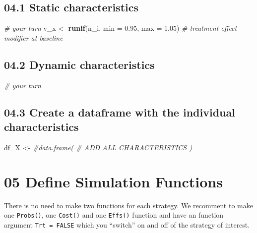 \documentclass[
]{article}
\newenvironment{Shaded}{\begin{snugshade}}{\end{snugshade}}
\newcommand{\CommentTok}[1]{\textcolor[rgb]{0.56,0.35,0.01}{\textit{#1}}}
\newcommand{\DataTypeTok}[1]{\textcolor[rgb]{0.13,0.29,0.53}{#1}}
\newcommand{\FloatTok}[1]{\textcolor[rgb]{0.00,0.00,0.81}{#1}}
\newcommand{\KeywordTok}[1]{\textcolor[rgb]{0.13,0.29,0.53}{\textbf{#1}}}
\newcommand{\NormalTok}[1]{#1}
\newcommand{\StringTok}[1]{\textcolor[rgb]{0.31,0.60,0.02}{#1}}
\begin{document}
\hypertarget{static-characteristics}{%
\subsection{04.1 Static characteristics}\label{static-characteristics}}

\begin{Shaded}
\begin{Highlighting}[]
\CommentTok{# your turn}
\NormalTok{v_x     <-}\StringTok{ }\KeywordTok{runif}\NormalTok{(n_i, }\DataTypeTok{min =} \FloatTok{0.95}\NormalTok{, }\DataTypeTok{max =} \FloatTok{1.05}\NormalTok{) }\CommentTok{# treatment effect modifier at baseline }
\end{Highlighting}
\end{Shaded}

\hypertarget{dynamic-characteristics}{%
\subsection{04.2 Dynamic
characteristics}\label{dynamic-characteristics}}

\begin{Shaded}
\begin{Highlighting}[]
\CommentTok{# your turn}
\end{Highlighting}
\end{Shaded}

\hypertarget{create-a-dataframe-with-the-individual-characteristics}{%
\subsection{04.3 Create a dataframe with the individual
characteristics}\label{create-a-dataframe-with-the-individual-characteristics}}

\begin{Shaded}
\begin{Highlighting}[]
\NormalTok{df_X    <-}\StringTok{ }\CommentTok{#data.frame( # ADD ALL CHARACTERISTICS ) }
\end{Highlighting}
\end{Shaded}

\hypertarget{define-simulation-functions}{%
\section{05 Define Simulation
Functions}\label{define-simulation-functions}}

There is no need to make two functions for each strategy. We recomment
to make one \texttt{Probs()}, one \texttt{Cost()} and one
\texttt{Effs()} function and have an function argument
\texttt{Trt\ =\ FALSE} which you ``switch'' on and off of the strategy
of interest.
\end{document}
